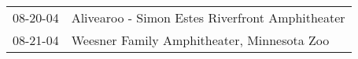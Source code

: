 \begin{supertabular}{p{0.25\columnwidth}p{0.75\columnwidth}}
 08-20-04 &  Alivearoo - Simon Estes Riverfront Amphitheater \\
 08-21-04 &       Weesner Family Amphitheater, Minnesota Zoo \\
\end{supertabular}
